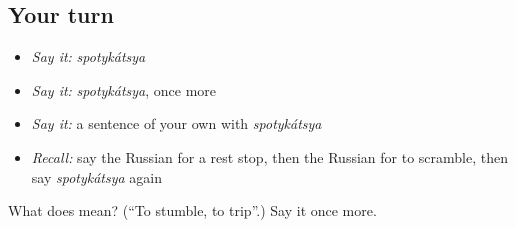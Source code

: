\subsection*{Your turn}
\begin{itemize}
\raggedright
  \item \emph{Say it:} \emph{spotykátsya}
  \item \emph{Say it:} \emph{spotykátsya}, once more
  \item \emph{Say it:} a sentence of your own with \emph{spotykátsya}
  \item \emph{Recall:} say the Russian for a rest stop, then the Russian for to scramble, then say \emph{spotykátsya} again
\end{itemize}

\begin{tcolorbox}[breakable,colback=teal!4,colframe=teal!35!black,title={Before you move on}]
What does  mean? (\textquotedblleft{}To stumble, to trip\textquotedblright{}.) Say it once more.
\end{tcolorbox}
